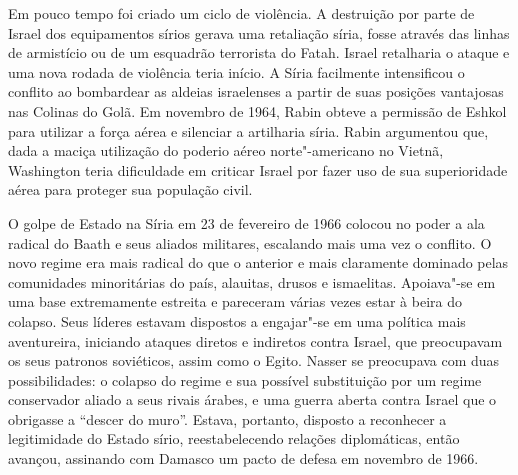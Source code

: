 
Em pouco tempo foi criado um ciclo de violência. A destruição por
parte de Israel dos equipamentos sírios gerava uma retaliação síria, fosse
através das linhas de armistício ou de um esquadrão terrorista do Fatah.
Israel retalharia o ataque e uma nova rodada de violência teria início.
A Síria facilmente intensificou o conflito ao bombardear as aldeias
israelenses a partir de suas posições vantajosas nas Colinas do Golã.
Em novembro de 1964, Rabin obteve a permissão de Eshkol para utilizar a
força aérea e silenciar a artilharia síria. Rabin argumentou que, dada a
maciça utilização do poderio aéreo norte"-americano no Vietnã, Washington
teria dificuldade em criticar Israel por fazer uso de sua superioridade
aérea para proteger sua população civil.

O golpe de Estado na Síria em 23 de fevereiro de 1966 colocou no poder a
ala radical do Baath e seus aliados militares, escalando mais uma vez o
conflito. O novo regime era mais radical do que o anterior
e mais claramente dominado pelas comunidades minoritárias do
país, alauitas, drusos e ismaelitas. Apoiava"-se em uma base extremamente
estreita e pareceram várias vezes estar à beira do colapso. Seus líderes
estavam dispostos a engajar"-se em uma política mais aventureira,
iniciando ataques diretos e indiretos contra Israel, que preocupavam os
seus patronos soviéticos, assim como o Egito. Nasser se preocupava com
duas possibilidades: o colapso do regime e sua possível substituição por
um regime conservador aliado a seus rivais árabes, e uma guerra aberta
contra Israel que o obrigasse a ``descer do muro''. Estava, portanto,
disposto a reconhecer a legitimidade do Estado sírio, reestabelecendo
relações diplomáticas, então avançou, assinando com Damasco um pacto de
defesa em novembro de 1966.

